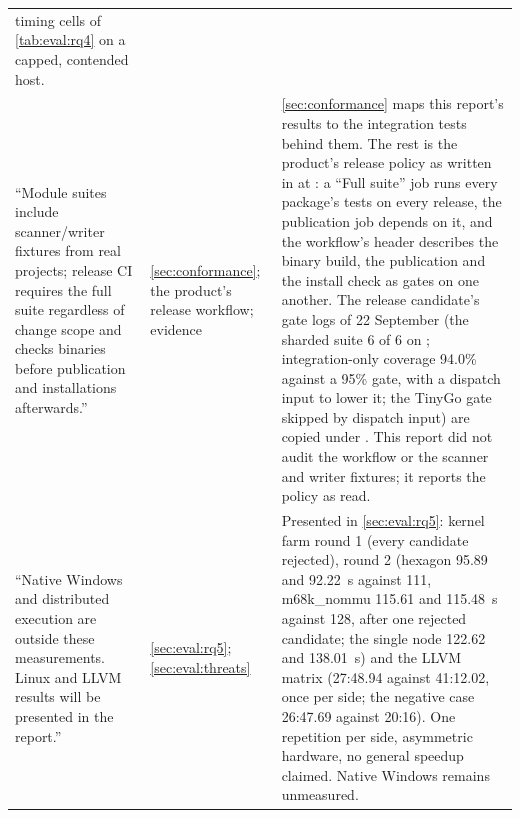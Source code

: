 \begin{center}
\begin{longtable}{@{}L{4.3cm}L{2.5cm}L{7.3cm}@{}}
timing cells of \cref{tab:eval:rq4} on a capped, contended host. \\
``Module suites include scanner/writer fixtures from real projects; release CI
requires the full suite regardless of change scope and checks binaries before
publication and installations afterwards.'' & \cref{sec:conformance}; the
product's release workflow; evidence
 &
\cref{sec:conformance} maps this report's results to the integration tests
behind them. The rest is the product's release policy as written in
 at : a ``Full suite''
job runs every package's tests on every release, the publication job depends
on it, and the workflow's header describes the binary build, the publication
and the install check as gates on one another. The release candidate's gate
logs of 22 September (the sharded suite 6 of 6 on ;
integration-only coverage 94.0\% against a 95\% gate, with a dispatch input to
lower it; the TinyGo gate skipped by dispatch input) are copied under
. This report did not audit the workflow or the scanner
and writer fixtures; it reports the policy as read. \\
``Native Windows and distributed execution are outside these measurements.
Linux and LLVM results will be presented in the report.'' &
\cref{sec:eval:rq5}; \cref{sec:eval:threats} & Presented in
\cref{sec:eval:rq5}: kernel farm round 1 (every candidate rejected), round 2
(hexagon 95.89 and 92.22~s against 111, m68k\_nommu 115.61 and 115.48~s
against 128, after one rejected candidate; the single node 122.62 and
138.01~s) and the LLVM matrix (27:48.94 against 41:12.02, once per side; the
negative case 26:47.69 against 20:16). One repetition per side, asymmetric
hardware, no general speedup claimed. Native Windows remains unmeasured. \\
\bottomrule
\end{longtable}
\end{center}
